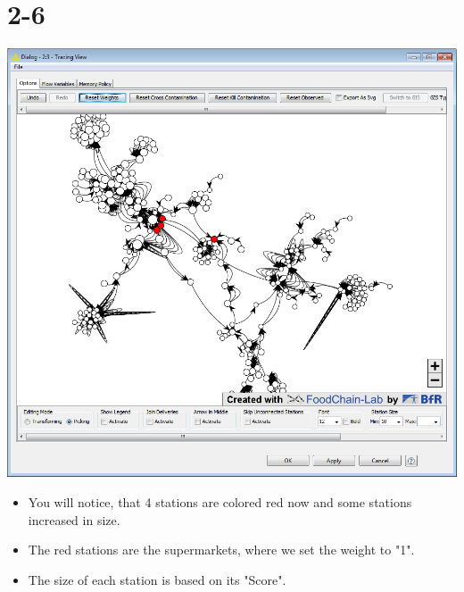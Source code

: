 \documentclass[10pt]{beamer}
\begin{document}
\section{2-6}
\begin{frame}
	\begin{center}
  		\includegraphics[height=0.6\textheight]{2-6.png}
	\end{center}
	\begin{itemize}
		\item You will notice, that 4 stations are colored red now and some stations increased in size.
		\item The red stations are the supermarkets, where we set the weight to "1".
		\item The size of each station is based on its "Score".
	\end{itemize}
\end{frame}
\end{document}
